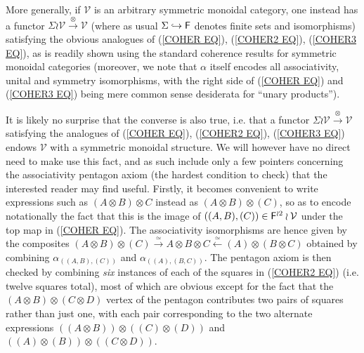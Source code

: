 \documentclass[a4paper,10pt]{article}%
\begin{document}
\begin{remark}
More generally, if $\mathcal{V}$ is an arbitrary
symmetric monoidal category, one instead has a functor 
$\Sigma \wr \mathcal{V} \xrightarrow{\otimes} \mathcal{V}$
(where as usual $\Sigma \hookrightarrow \mathsf{F}$ denotes finite sets and isomorphisms) satisfying the obvious analogues of
(\ref{COHER EQ}), (\ref{COHER2 EQ}), (\ref{COHER3 EQ}),
as is readily shown using the standard coherence results for symmetric monoidal categories 
(moreover, we note that $\alpha$ itself encodes all associativity, unital and symmetry isomorphisms, with the 
right side of (\ref{COHER EQ}) and (\ref{COHER3 EQ})
being mere common sense desiderata for ``unary products'').

It is likely no surprise that the converse is also true, i.e. 
that a functor 
$\Sigma \wr \mathcal{V} \xrightarrow{\otimes} \mathcal{V}$
satisfying the analogues of 
(\ref{COHER EQ}), (\ref{COHER2 EQ}), (\ref{COHER3 EQ})
endows $\mathcal{V}$ with a symmetric monoidal structure.
We will however have no direct need to make use this fact, and as such include only a few pointers concerning the associativity pentagon axiom (the hardest condition to check) that the interested reader may find useful. 
Firstly, it becomes convenient to write expressions such as
$(A \otimes B) \otimes C$ instead as 
$(A \otimes B) \otimes (C)$, so as to encode notationally the fact that this is the image of 
$((A,B),(C)) \in \mathsf{F}^{\wr 2} \wr \mathcal{V}$ under the top map in (\ref{COHER EQ}). The associativity isomorphisms are hence given by the composites
$
(A \otimes B) \otimes (C) \xrightarrow{\simeq} 
A \otimes B \otimes C \xleftarrow{\simeq}
(A) \otimes (B \otimes C)
$
obtained by combining 
$\alpha_{((A,B),(C))}$ 
and
$\alpha_{((A),(B,C))}$.
The pentagon axiom is then checked by combining \textit{six} instances of each of the squares in (\ref{COHER2 EQ}) (i.e. twelve squares total), most of which are obvious except for the fact that the $(A\otimes B) \otimes (C \otimes D)$ vertex of the pentagon contributes two pairs of squares rather than just one, with each pair corresponding to the two alternate expressions 
$((A \otimes B)) \otimes ((C) \otimes (D))$ and 
$((A) \otimes (B)) \otimes ((C \otimes D))$.
\end{remark}

\end{document}
